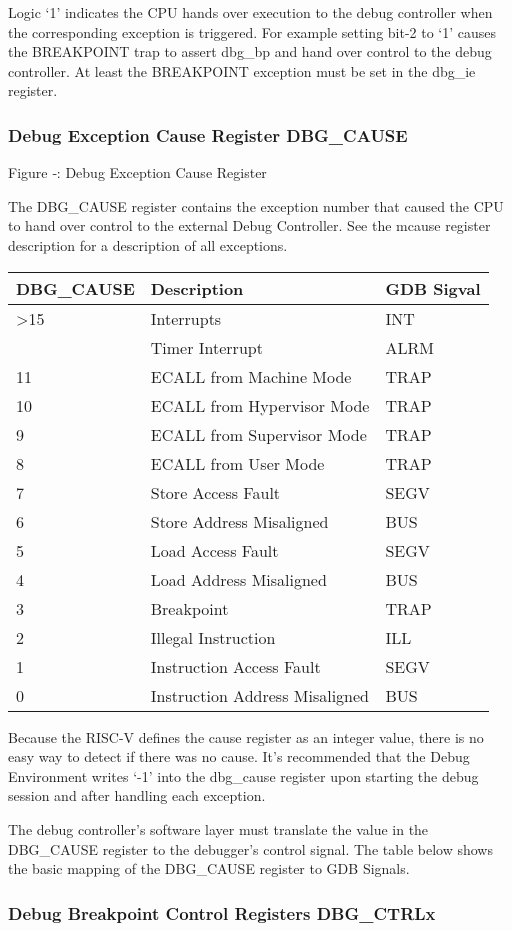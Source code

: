 Logic `1' indicates the CPU hands over execution to the debug controller
when the corresponding exception is triggered. For example setting bit-2
to `1' causes the BREAKPOINT trap to assert dbg\_bp and hand over
control to the debug controller. At least the BREAKPOINT exception must
be set in the dbg\_ie register.

\subsubsection{Debug Exception Cause Register
DBG\_CAUSE}\label{debug-exception-cause-register-dbg_cause}

\missingfigure{}

Figure ‑: Debug Exception Cause Register

The DBG\_CAUSE register contains the exception number that caused the
CPU to hand over control to the external Debug Controller. See the
mcause register description for a description of all exceptions.

\begin{longtable}[]{@{}lll@{}}
\toprule
DBG\_CAUSE & Description & GDB Sigval\tabularnewline
\midrule
\endhead
\textgreater{}15 & Interrupts & INT\tabularnewline
& Timer Interrupt & ALRM\tabularnewline
11 & ECALL from Machine Mode & TRAP\tabularnewline
10 & ECALL from Hypervisor Mode & TRAP\tabularnewline
9 & ECALL from Supervisor Mode & TRAP\tabularnewline
8 & ECALL from User Mode & TRAP\tabularnewline
7 & Store Access Fault & SEGV\tabularnewline
6 & Store Address Misaligned & BUS\tabularnewline
5 & Load Access Fault & SEGV\tabularnewline
4 & Load Address Misaligned & BUS\tabularnewline
3 & Breakpoint & TRAP\tabularnewline
2 & Illegal Instruction & ILL\tabularnewline
1 & Instruction Access Fault & SEGV\tabularnewline
0 & Instruction Address Misaligned & BUS\tabularnewline
\bottomrule
\end{longtable}

Because the RISC-V defines the cause register as an integer value, there
is no easy way to detect if there was no cause. It's recommended that
the Debug Environment writes `-1' into the dbg\_cause register upon
starting the debug session and after handling each exception.

The debug controller's software layer must translate the value in the
DBG\_CAUSE register to the debugger's control signal. The table below
shows the basic mapping of the DBG\_CAUSE register to GDB Signals.

\subsubsection{Debug Breakpoint Control Registers
DBG\_CTRLx}\label{debug-breakpoint-control-registers-dbg_ctrlx}

